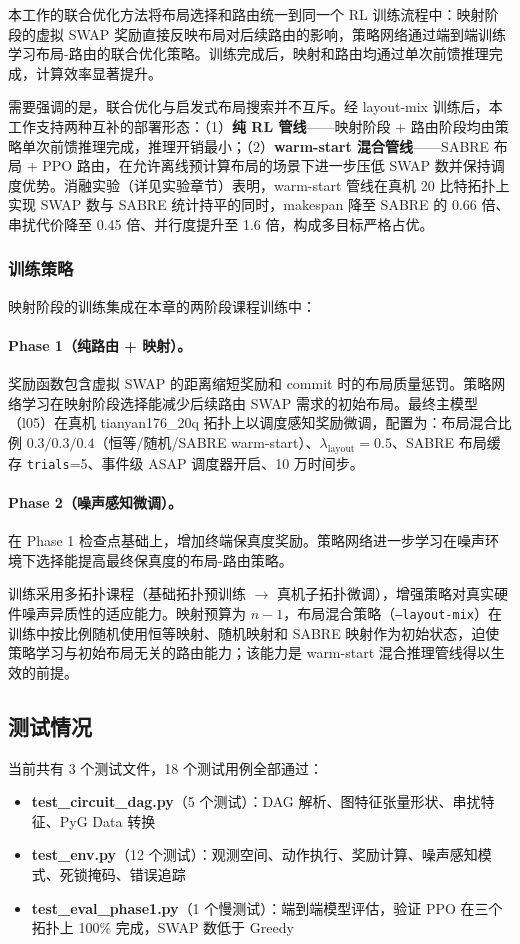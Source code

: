 本工作的联合优化方法将布局选择和路由统一到同一个 RL 训练流程中：映射阶段的虚拟 SWAP 奖励直接反映布局对后续路由的影响，策略网络通过端到端训练学习布局-路由的联合优化策略。训练完成后，映射和路由均通过单次前馈推理完成，计算效率显著提升。

需要强调的是，联合优化与启发式布局搜索并不互斥。经 layout-mix 训练后，本工作支持两种互补的部署形态：（1）\textbf{纯 RL 管线}——映射阶段 + 路由阶段均由策略单次前馈推理完成，推理开销最小；（2）\textbf{warm-start 混合管线}——SABRE 布局 + PPO 路由，在允许离线预计算布局的场景下进一步压低 SWAP 数并保持调度优势。消融实验（详见实验章节）表明，warm-start 管线在真机 20 比特拓扑上实现 SWAP 数与 SABRE 统计持平的同时，makespan 降至 SABRE 的 0.66 倍、串扰代价降至 0.45 倍、并行度提升至 1.6 倍，构成多目标严格占优。

\subsubsection{训练策略}

映射阶段的训练集成在本章的两阶段课程训练中：

\paragraph{Phase 1（纯路由 + 映射）。} 奖励函数包含虚拟 SWAP 的距离缩短奖励和 commit 时的布局质量惩罚。策略网络学习在映射阶段选择能减少后续路由 SWAP 需求的初始布局。最终主模型（l05）在真机 tianyan176\_20q 拓扑上以调度感知奖励微调，配置为：布局混合比例 $0.3/0.3/0.4$（恒等/随机/SABRE warm-start）、$\lambda_{\text{layout}} = 0.5$、SABRE 布局缓存 \texttt{trials}=5、事件级 ASAP 调度器开启、10 万时间步。

\paragraph{Phase 2（噪声感知微调）。} 在 Phase 1 检查点基础上，增加终端保真度奖励。策略网络进一步学习在噪声环境下选择能提高最终保真度的布局-路由策略。

训练采用多拓扑课程（基础拓扑预训练 $\to$ 真机子拓扑微调），增强策略对真实硬件噪声异质性的适应能力。映射预算为 $n - 1$，布局混合策略（\texttt{--layout-mix}）在训练中按比例随机使用恒等映射、随机映射和 SABRE 映射作为初始状态，迫使策略学习与初始布局无关的路由能力；该能力是 warm-start 混合推理管线得以生效的前提。

\subsection{测试情况}

当前共有 3 个测试文件，18 个测试用例全部通过：

\begin{itemize}
  \item \textbf{test\_circuit\_dag.py}（5 个测试）：DAG 解析、图特征张量形状、串扰特征、PyG Data 转换
  \item \textbf{test\_env.py}（12 个测试）：观测空间、动作执行、奖励计算、噪声感知模式、死锁掩码、错误追踪
  \item \textbf{test\_eval\_phase1.py}（1 个慢测试）：端到端模型评估，验证 PPO 在三个拓扑上 100\% 完成，SWAP 数低于 Greedy
\end{itemize}
